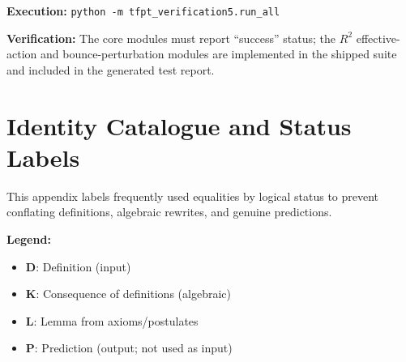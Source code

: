 \textbf{Execution:} \texttt{python -m tfpt\_verification5.run\_all}

\textbf{Verification:} The core modules must report ``success'' status; the
$R^2$ effective-action and bounce-perturbation modules are implemented in the shipped suite and included in the generated test report.

\section{Identity Catalogue and Status Labels}
\label{app:identities}

This appendix labels frequently used equalities by logical status to prevent conflating definitions, algebraic rewrites, and genuine predictions.

\textbf{Legend:}
\begin{itemize}[leftmargin=1.5em, topsep=2pt, itemsep=1pt]
    \item \textbf{D}: Definition (input)
    \item \textbf{K}: Consequence of definitions (algebraic)
    \item \textbf{L}: Lemma from axioms/postulates
    \item \textbf{P}: Prediction (output; not used as input)
\end{itemize}

